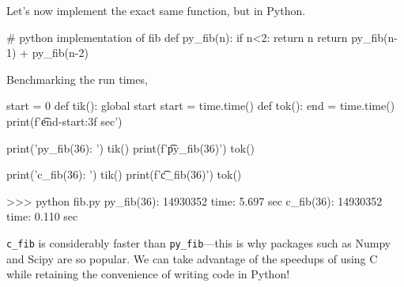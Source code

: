 \documentclass[12pt]{article}
\numberwithin{equation}{section}
\begin{document}
Let's now implement the exact same function, but in Python.

\begin{python}
	# python implementation of fib 
	def py_fib(n):
	    if n<2:
	        return n
	    return py_fib(n-1) + py_fib(n-2)
	
\end{python}
Benchmarking the run times,
\begin{python}
	start = 0
	def tik():
	    global start
	    start = time.time()
	def tok():
	    end = time.time()
	    print(f'\t{end-start:3f} sec')
	
	
	print('py_fib(36): ')
	tik()
	print(f'\t{py_fib(36)}')
	tok()
	
	print('c_fib(36): ')
	tik()
	print(f'\t{c_fib(36)}')
	tok()
	
	>>> python fib.py
	py_fib(36): 
	    14930352
	    time: 5.697 sec
	c_fib(36): 
	    14930352
	    time: 0.110 sec
\end{python}
  
\verb|c_fib| is considerably faster than \verb|py_fib|---this is why packages such as Numpy and Scipy are so popular. We can take advantage of the speedups of using C while retaining the convenience of writing code in Python!
	
\end{document}

